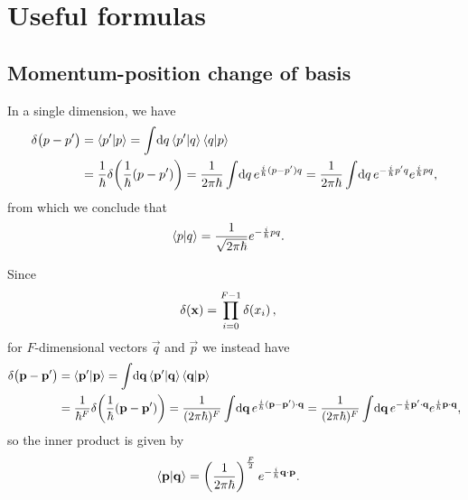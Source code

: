 \chapter{Useful formulas}


\section{Momentum-position change of basis}

In a single dimension, we have~\cite[55-56]{sakurai1985modern}
\begin{subequations}
\begin{align}
	\ddf{p - p'}
	&= \braket{p' | p}
	= \int\! \dif q \braket{p' | q} \braket{q | p} \\
	&= \frac{1}{\hbar} \ddf{\frac{1}{\hbar} (p - p')}
	= \frac{1}{2 \pi \hbar} \int\! \dif q \, e^{\frac{i}{\hbar} (p - p') q}
	= \frac{1}{2 \pi \hbar} \int\! \dif q \, e^{-\frac{i}{\hbar} p' q} e^{\frac{i}{\hbar} p q},
\end{align}
\end{subequations}
from which we conclude that
\begin{align}
	\braket{p | q}
	&= \frac{1}{\sqrt{2 \pi \hbar}} e^{-\frac{i}{\hbar} p q}.
\end{align}

Since~\cite[59]{sakurai1985modern}
\begin{align}
	\delta\!\left( \bm{\mathbf{x}} \right)
	&= \prod_{i=0}^{F-1} \delta\!\left( x_i \right),
\end{align}
for $F$-dimensional vectors $\vec{q}$ and $\vec{p}$ we instead have
\begin{subequations}
\begin{align}
	\ddf{\vec{p} - \vec{p}'}
	&= \braket{\vec{p}' | \vec{p}}
	= \int\! \dif \vec{q} \braket{\vec{p}' | \vec{q}} \braket{\vec{q} | \vec{p}} \\
	&= \frac{1}{\hbar^F} \ddf{\frac{1}{\hbar} (\vec{p} - \vec{p}')}
	= \frac{1}{(2 \pi \hbar)^F} \int\! \dif \vec{q} \, e^{\frac{i}{\hbar} (\vec{p} - \vec{p}') \cdot \vec{q}}
	= \frac{1}{(2 \pi \hbar)^F} \int\! \dif \vec{q} \, e^{-\frac{i}{\hbar} \vec{p}' \cdot \vec{q}} e^{\frac{i}{\hbar} \vec{p} \cdot \vec{q}},
\end{align}
\end{subequations}
so the inner product is given by
\begin{align}
	\braket{\bm{\mathbf{p}} | \bm{\mathbf{q}}}
	&= \left( \frac{1}{2 \pi \hbar} \right)^\frac{F}{2} e^{-\frac{i}{\hbar} \bm{\mathbf{q}} \cdot \bm{\mathbf{p}}}.
		\label{eq:pq-inner}
\end{align}


